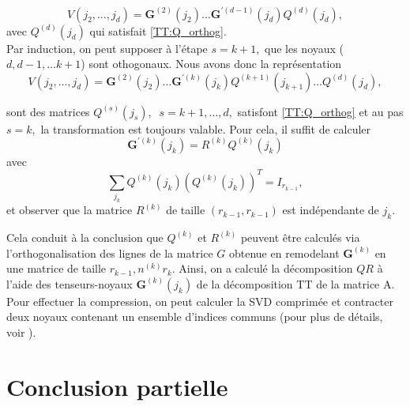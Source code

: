 \documentclass[11pt,a4paper,oneside]{book}
\def\G{\mathfrak G}
\def\G{\mathbf G}
\begin{document}
 $$V(j_2,\ldots,j_d) = \G^{(2)}(j_2)\ldots \G^{'(d-1)}(j_d)Q^{(d)}(j_d),$$
 avec $Q^{(d)}(j_d)$ qui satisfait \eqref{TT:Q_orthog}.\\
 
 Par induction, on peut supposer à l'étape $s = k+1,$ que les noyaux ($d,d-1,\ldots k+1$) sont othogonaux.
  Nous avons donc la représentation
	\begin{equation}
	V(j_2,\ldots,j_d) = \G^{(2)}(j_2)\ldots \G^{'(k)}(j_k)Q^{(k+1)}(j_{k+1})\ldots Q^{(d)}(j_d),
	\end{equation}
	
	sont des matrices $Q^{(s)}(j_s),\;\; s = k+1,\ldots,d,$ satisfont \eqref{TT:Q_orthog} et au pas $s = k,$ la transformation est toujours valable. Pour cela, il suffit de calculer	\begin{equation}
	\label{TT:QR_Gd}
	\G^{'(k)}(j_k) = R^{(k)}Q^{(k)}(j_k) 
	\end{equation}
	avec
	\begin{equation}
	\label{TT:Q_orthog2}
	\sum_{j_k}Q^{(k)}(j_k)\left(Q^{(k)}(j_k)\right)^T = I_{r_{k-1}},
	\end{equation}
et observer que la matrice $R^{(k)}$ de taille $(r_{k-1},r_{k-1})$ est indépendante de $j_k.$

Cela conduit à la conclusion que $Q^{(k)}$ et $R^{(k)}$ peuvent être calculés via l'orthogonalisation des lignes de la matrice $ G $ obtenue en remodelant $\G^{(k)}$ en une matrice de taille $r_{k-1},n^{(k)}r_k$. Ainsi, on a calculé la décomposition $ QR $ à l'aide des tenseurs-noyaux $\G^{(k)}(j_k)$ de la décomposition TT de la matrice A. Pour effectuer la compression, on peut calculer la SVD comprimée et contracter deux noyaux contenant un ensemble d'indices communs (pour plus de détails, voir \cite[p.2305]{oseledets2011tensor}).

\section*{Conclusion partielle}
\end{document}
